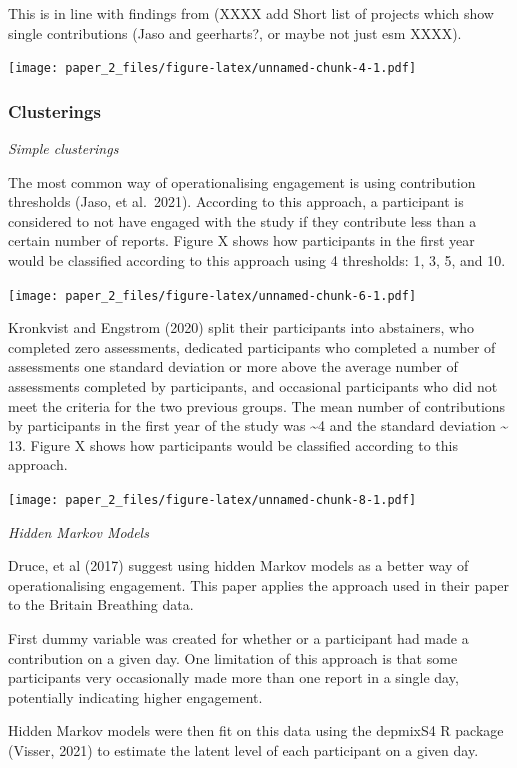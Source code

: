 \documentclass[
]{article}
\begin{document}
This is in line with findings from (XXXX add Short list of projects
which show single contributions (Jaso and geerharts?, or maybe not just
esm XXXX).

\texttt{[image: paper\_2\_files/figure-latex/unnamed-chunk-4-1.pdf]}

\hypertarget{clusterings}{%
\subsubsection{Clusterings}\label{clusterings}}

\emph{Simple clusterings}

The most common way of operationalising engagement is using contribution
thresholds (Jaso, et al.~2021). According to this approach, a
participant is considered to not have engaged with the study if they
contribute less than a certain number of reports. Figure X shows how
participants in the first year would be classified according to this
approach using 4 thresholds: 1, 3, 5, and 10.

\texttt{[image: paper\_2\_files/figure-latex/unnamed-chunk-6-1.pdf]}

Kronkvist and Engstrom (2020) split their participants into abstainers,
who completed zero assessments, dedicated participants who completed a
number of assessments one standard deviation or more above the average
number of assessments completed by participants, and occasional
participants who did not meet the criteria for the two previous groups.
The mean number of contributions by participants in the first year of
the study was \textasciitilde4 and the standard deviation
\textasciitilde{} 13. Figure X shows how participants would be
classified according to this approach.

\texttt{[image: paper\_2\_files/figure-latex/unnamed-chunk-8-1.pdf]}

\emph{Hidden Markov Models}

Druce, et al (2017) suggest using hidden Markov models as a better way
of operationalising engagement. This paper applies the approach used in
their paper to the Britain Breathing data.

First dummy variable was created for whether or a participant had made a
contribution on a given day. One limitation of this approach is that
some participants very occasionally made more than one report in a
single day, potentially indicating higher engagement.

Hidden Markov models were then fit on this data using the depmixS4 R
package (Visser, 2021) to estimate the latent level of each participant
on a given day.
\end{document}

